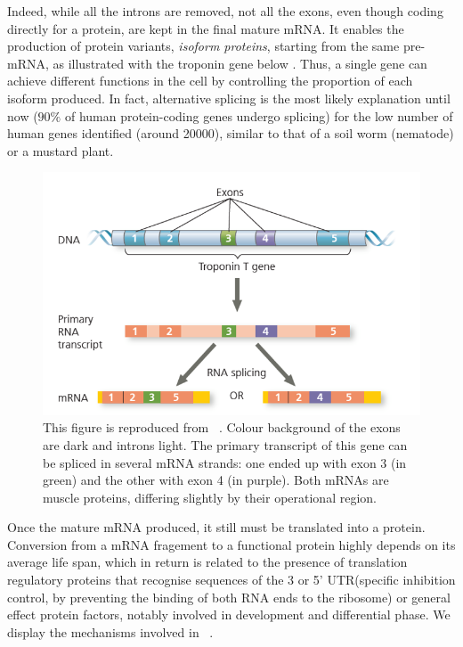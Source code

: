 Indeed, while all the introns are removed, not all the exons, even though coding directly for a protein, are kept in the final mature mRNA. It enables the production of protein variants, \emph{isoform proteins}, starting from the same pre-mRNA, as illustrated with the troponin gene below . Thus, a single gene can achieve different functions in the cell by controlling the proportion of each isoform produced. In fact, alternative splicing is the most likely explanation until now ($90\%$ of human protein-coding genes undergo splicing) for the low number of human genes identified (around \num{20000}), similar to that of a soil worm (nematode) or a mustard plant. 

\begin{figure}
    \centering
    \includegraphics{figures/alternative-splicing.png}
    \caption[Alternative RNA splicing of the troponin T gene.]{This figure is reproduced from ~\autocite[Fig.~18.14, p.~378]{campbell_etal20}. Colour background of the exons are dark and introns light. The primary transcript of this gene can be spliced in several mRNA strands:  one ended up with exon 3 (in green) and the other with exon 4 (in purple). Both mRNAs are muscle proteins, differing slightly by their operational region.}
    \label{fig:alternative-splicing}
\end{figure}
Once the mature mRNA produced, it still must be translated into a protein. Conversion from a mRNA fragement to a functional protein highly depends on its average life span, which in return is related to the presence of translation regulatory proteins that recognise sequences of the 3 or 5' UTR(specific inhibition control, by preventing the binding of both RNA ends to the ribosome) or general effect protein factors, notably involved in development and differential phase. We display the mechanisms involved in ~.

